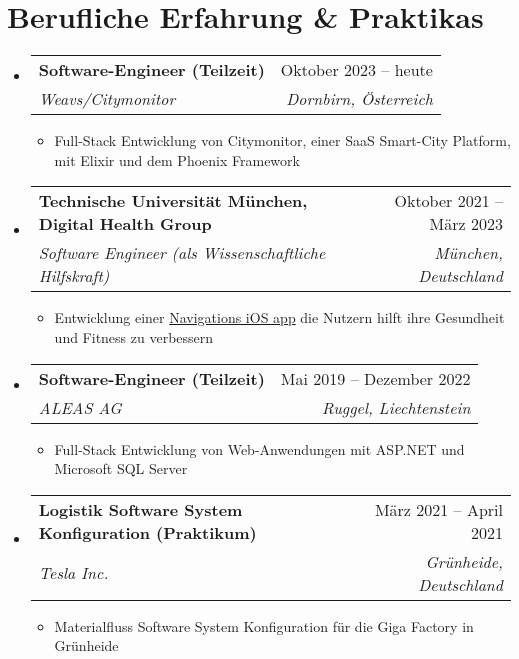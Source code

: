 \documentclass[letterpaper,11pt]{article}
\makeatletter
\newcommand{\resumeItem}[1]{
  \item\small{
    {#1 \vspace{-2pt}}
  }
}
\newcommand{\resumeSubheading}[4]{
  \vspace{-2pt}\item
    \begin{tabular*}{0.97\textwidth}[t]{l@{\extracolsep{\fill}}r}
      \textbf{#1} & #2 \\
      \textit{\small#3} & \textit{\small #4} \\
    \end{tabular*}\vspace{-7pt}
}
\newcommand{\resumeSubHeadingListStart}{\begin{itemize}[leftmargin=0.15in, label={}]}
\newcommand{\resumeSubHeadingListEnd}{\end{itemize}}
\newcommand{\resumeItemListStart}{\begin{itemize}}
\newcommand{\resumeItemListEnd}{\end{itemize}\vspace{-5pt}}
\makeatother
\begin{document}
\section{Berufliche Erfahrung \& Praktikas}
  \resumeSubHeadingListStart

  \resumeSubheading
  {Software-Engineer (Teilzeit)}{Oktober 2023 -- heute}
  {Weavs/Citymonitor}{Dornbirn, Österreich}
  \resumeItemListStart
    \resumeItem{Full-Stack Entwicklung von Citymonitor, einer SaaS Smart-City Platform, mit Elixir und dem Phoenix Framework}
  \resumeItemListEnd
  
  \resumeSubheading
    {Technische Universität München, Digital Health Group}{Oktober 2021 -- März 2023}
    {Software Engineer (als Wissenschaftliche Hilfskraft)}{München, Deutschland}
    \resumeItemListStart
      \resumeItem{Entwicklung einer \href{https://github.com/dhg-applab/HeMo}{Navigations iOS app} die Nutzern hilft ihre Gesundheit und Fitness zu verbessern}
    \resumeItemListEnd

  \resumeSubheading
    {Software-Engineer (Teilzeit)}{Mai 2019 -- Dezember 2022}
    {ALEAS AG}{Ruggel, Liechtenstein}
    \resumeItemListStart
      \resumeItem{Full-Stack Entwicklung von Web-Anwendungen mit ASP.NET und Microsoft SQL Server}
    \resumeItemListEnd

  \resumeSubheading
    {Logistik Software System Konfiguration (Praktikum)}{März 2021 -- April 2021}
    {Tesla Inc.}{Grünheide, Deutschland}
    \resumeItemListStart
      \resumeItem{Materialfluss Software System Konfiguration für die Giga Factory in Grünheide}
    \resumeItemListEnd


  \resumeSubHeadingListEnd
\end{document}
